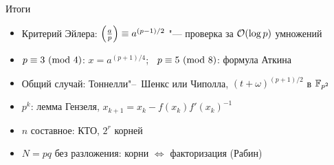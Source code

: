 \documentclass{ca-slides}
\begin{document}
\begin{canvasframe}{Итоги}
  \begin{itemize}
    \item Критерий Эйлера: $\left(\frac{a}{p}\right) \equiv a^{(p-1)/2}$ "--- проверка за $\mathcal{O}(\log p)$
      умножений
    \item $p \equiv 3 \ (\mathrm{mod}\ 4)$: $x = a^{(p+1)/4}$; \ $p \equiv 5 \ (\mathrm{mod}\ 8)$: формула Аткина
    \item Общий случай: Тоннелли"--~Шенкс или Чиполла, $(t + \omega)^{(p+1)/2}$ в $\mathbb{F}_{p^2}$
    \item $p^k$: лемма Гензеля, $x_{k+1} = x_k - f(x_k) f'(x_k)^{-1}$
    \item $n$ составное: КТО, $2^r$ корней
    \item $N = pq$ без разложения: корни $\Leftrightarrow$ факторизация (Рабин)
  \end{itemize}
\end{canvasframe}
\end{document}
